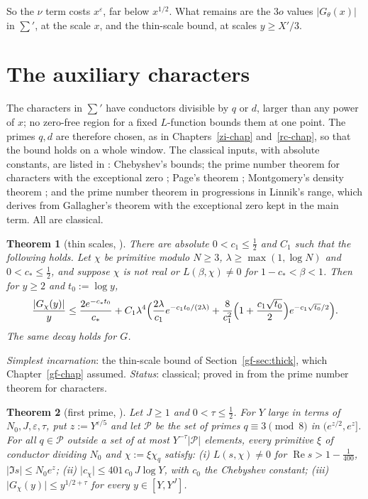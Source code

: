 \documentclass[reqno]{amsart}
\newcounter{chap}
\theoremstyle{definition}
\theoremstyle{plain}
\newtheorem{theorem}{Theorem}[section]
\renewcommand{\Re}{\operatorname{Re}}
\begin{document}
So the \(\nu\) term costs \(x^\varepsilon\), far below \(x^{1/2}\).  What remains are the \(3o\) values \(\lvert G_\theta(x)\rvert\) in \(\sum'\), at the scale \(x\), and the thin-scale bound, at scales \(y \ge X'/3\).

\section{The auxiliary characters}\label{sec:aux}

The characters in \(\sum'\) have conductors divisible by \(q\) or \(d\), larger than any power of \(x\); no zero-free region for a fixed \(L\)-function bounds them at one point.  The primes \(q, d\) are therefore chosen, as in Chapters~\ref{zi-chap} and~\ref{rc-chap}, so that the bound holds on a whole window.  The classical inputs, with absolute constants, are listed in \cite[\S5.1]{Adr}: Chebyshev's bounds; the prime number theorem for characters with the exceptional zero \cite[Ch.~20]{Dav}; Page's theorem \cite{Pa}; Montgomery's density theorem \cite[Thm.~12.2]{Mon}; and the prime number theorem in progressions in Linnik's range, which \cite[(C7)]{Adr} derives from Gallagher's theorem \cite[Thm.~7]{Gal} with the exceptional zero kept in the main term.  All are classical. %

\begin{theorem}[thin scales, {\cite[Prop.~5.3]{Adr}}]\label{thm:thin}
There are absolute \(0 < c_1 \le \frac12\) and \(C_1\) such that the following holds.  Let \(\chi\) be primitive modulo \(N \ge 3\), \(\lambda \ge \max(1, \log N)\) and \(0 < c_\ast \le \frac12\), and suppose \(\chi\) is not real or \(L(\beta,\chi) \ne 0\) for \(1 - c_\ast < \beta < 1\).  Then for \(y \ge 2\) and \(t_0 := \log y\),
\[
  \frac{\lvert G_\chi(y)\rvert}{y} \le \frac{2e^{-c_\ast t_0}}{c_\ast} + C_1\lambda^4\Bigl(\frac{2\lambda}{c_1}e^{-c_1t_0/(2\lambda)} + \frac{8}{c_1^2}\Bigl(1 + \frac{c_1\sqrt{t_0}}{2}\Bigr)e^{-c_1\sqrt{t_0}/2}\Bigr) .
\]
The same decay holds for \(G\).
\end{theorem}

\noindent\emph{Simplest incarnation}: the thin-scale bound of Section~\ref{gf-sec:thick}, which Chapter~\ref{gf-chap} assumed.  \emph{Status}: classical; proved in \cite{Adr} from the prime number theorem for characters.

\begin{theorem}[first prime, {\cite[Thm.~5.10]{Adr}}]\label{thm:first}
Let \(J \ge 1\) and \(0 < \tau \le \frac12\).  For \(Y\) large in terms of \(N_0, J, \varepsilon, \tau\), put \(z := Y^{\varepsilon/5}\) and let \(\mathcal{P}\) be the set of primes \(q \equiv 3 \pmod 8\) in \((e^{z/2}, e^z]\).  For all \(q \in \mathcal{P}\) outside a set of at most \(Y^{-\tau}\lvert\mathcal{P}\rvert\) elements, every primitive \(\xi\) of conductor dividing \(N_0\) and \(\chi := \xi\chi_q\) satisfy:
(i) \(L(s,\chi) \ne 0\) for \(\Re s > 1 - \frac1{400}\), \(\lvert\Im s\rvert \le N_0e^z\);
(ii) \(\lvert c_\chi\rvert \le 401\,c_0\,J\log Y\), with \(c_0\) the Chebyshev constant;
(iii) \(\lvert G_\chi(y)\rvert \le y^{1/2+\tau}\) for every \(y \in [Y, Y^J]\).
\end{theorem}
\end{document}
